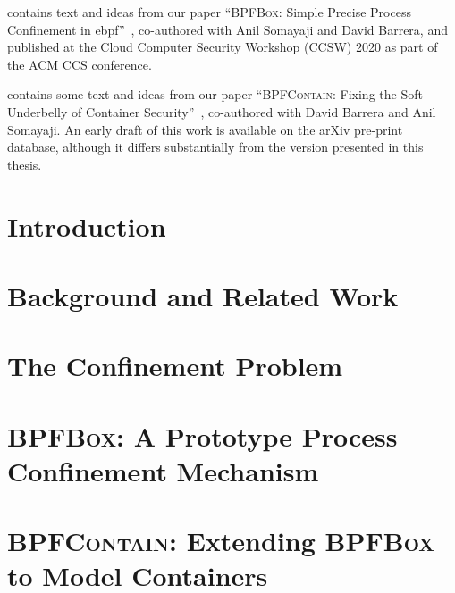 \documentclass[
  fontsize=12pt,
  titlepage=firstiscover,
  paper=letter,
  oneside,
  cleardoublepage=plain,
  parskip=half-,
  DIV=10,
  parindent,
  appendixprefix,
  chapterprefix,
  listof=totoc,
]{scrbook}
\newcommand{\bpfbox}{\textsc{BPFBox}}
\newcommand{\bpfcontain}{\textsc{BPFContain}}
\begin{document}
 contains text and ideas from our paper \enquote{\bpfbox{}: Simple Precise
Process Confinement in \gls{ebpf}}~\cite{findlay2020_bpfbox}, co-authored with Anil
Somayaji and David Barrera, and published at the Cloud Computer Security Workshop (CCSW)
2020 as part of the ACM CCS conference.

 contains some text and ideas from our paper \enquote{\bpfcontain{}:
Fixing the Soft Underbelly of Container Security}~\cite{findlay2021_bpfcontain},
co-authored with David Barrera and Anil Somayaji. An early draft of this work is available
on the arXiv pre-print database, although it differs substantially from the version
presented in this thesis.
\endgroup
\cleardoublepage%

\begingroup
\hypersetup{linkcolor=black}
\tableofcontents
\begin{singlespace}
\listoffigures
\listoftables
\lstlistoflistings
\end{singlespace}
\endgroup

\mainmatter%


\chapter{Introduction}%
\label{c:introduction}


\chapter{Background and Related Work}%
\label{c:background}


\chapter{The Confinement Problem}%
\label{c:confinement-problem}


\chapter{\bpfbox: A Prototype Process Confinement Mechanism}%
\label{c:bpfbox}


\chapter{\bpfcontain: Extending \bpfbox{} to Model Containers}%
\label{c:bpfcontain}

\end{document}
